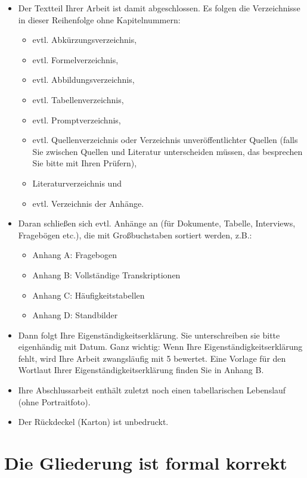 \begin{itemize}[label={--}]
\item Der Textteil Ihrer Arbeit ist damit abgeschlossen. Es folgen die Verzeichnisse in dieser Reihenfolge ohne Kapitelnummern:
  \begin{itemize}[label={\bullet}]
  \item evtl. Abkürzungsverzeichnis,
  \item evtl. Formelverzeichnis,
  \item evtl. Abbildungsverzeichnis,
  \item evtl. Tabellenverzeichnis,
  \item evtl. Promptverzeichnis,
  \item evtl. Quellenverzeichnis oder Verzeichnis unveröffentlichter Quellen (falls Sie zwischen Quellen und Literatur unterscheiden müssen, das besprechen Sie bitte mit Ihren Prüfern),
  \item Literaturverzeichnis und
  \item evtl. Verzeichnis der Anhänge.
  \end{itemize}

\item Daran schließen sich evtl. Anhänge an (für Dokumente, Tabelle, Interviews, Fragebögen etc.), die mit Großbuchstaben sortiert werden, z.B.:
  \begin{itemize}[leftmargin=*,label={}]
  \item Anhang A: Fragebogen
  \item Anhang B: Vollständige Transkriptionen
  \item Anhang C: Häufigkeitstabellen
  \item Anhang D: Standbilder
  \end{itemize}

\item Dann folgt Ihre Eigenständigkeitserklärung. Sie unterschreiben sie bitte eigenhändig mit Datum. Ganz wichtig: Wenn Ihre Eigenständigkeitserklärung fehlt, wird Ihre Arbeit zwangsläufig mit 5 bewertet. Eine Vorlage für den Wortlaut Ihrer Eigenständigkeitserklärung finden Sie in Anhang B.
\item Ihre Abschlussarbeit enthält zuletzt noch einen tabellarischen Lebenslauf (ohne Portraitfoto).
\item Der Rückdeckel (Karton) ist unbedruckt.
\end{itemize}

\section{Die Gliederung ist formal korrekt}
\label{sec:gliederung-formal-korrekt}

